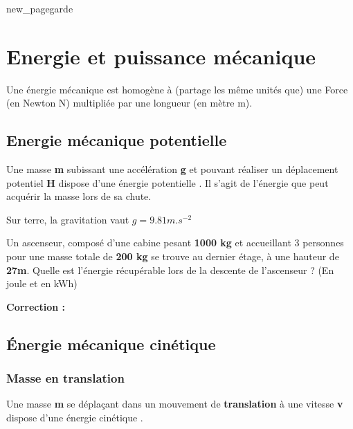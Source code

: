 \documentclass[10pt,fleqn]{article} %
\begin{document}
{new_pagegarde}


\section{Energie et puissance mécanique}
Une énergie mécanique est homogène à (partage les même unités que) une Force (en Newton N) multipliée par une longueur (en mètre m).
\subsection{Energie mécanique potentielle}
\begin{defi}
    Une masse \textbf{m} subissant une accélération \textbf{g} et pouvant réaliser un déplacement potentiel 
    \textbf{H} dispose d'une énergie potentielle 
    . 
    Il s'agit de l'énergie que peut acquérir la masse lors de sa chute. 
\end{defi}


Sur terre, la gravitation vaut $g = 9.81 m.s^{-2}$

\begin{exemple}
    Un ascenseur, composé d'une cabine pesant \textbf{1000 kg} et accueillant 3 personnes pour une masse totale de \textbf{200 kg} se trouve au dernier étage, à une hauteur de \textbf{27m}. 
Quelle est l'énergie récupérable lors de la descente de l'ascenseur ? (En joule et en kWh) 

\afaire{}

\correction \textbf{Correction : } 
\end{exemple}


\subsection{Énergie mécanique cinétique}
\subsubsection{Masse en translation}
\begin{defi}
  Une masse \textbf{m} se déplaçant dans un mouvement de \textbf{translation} à une vitesse \textbf{v} dispose d'une énergie cinétique .   
\end{defi}
\end{document}
